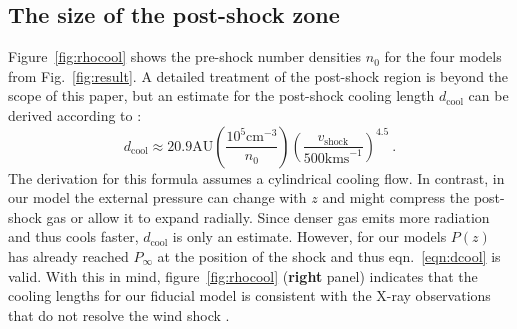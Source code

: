 \subsection{The size of the post-shock zone}
Figure~\ref{fig:rhocool} shows the pre-shock number densities $n_0$ for the four models from Fig.~\ref{fig:result}. A detailed treatment of the post-shock region is beyond the scope of this paper, but an estimate for the post-shock cooling length $d_{\mathrm{cool}}$ can be derived according to \citet{2002ApJ...576L.149R}:
\begin{equation} \label{eqn:dcool}
d_{\mathrm{cool}} \approx 20.9 \mathrm{ AU}
    \left(\frac{10^5\mathrm{ cm}^{-3}}{n_0}\right)
    \left(\frac{v_{\mathrm{shock}}}{500\mathrm{ km s}^{-1}}\right)^{4.5}\ .
\end{equation}
The derivation for this formula assumes a cylindrical cooling flow. In contrast, in our model the external pressure can change with $z$ and might compress the post-shock gas or allow it to expand radially. Since denser gas emits more radiation and thus cools faster, $d_{\mathrm{cool}}$ is only an estimate. However, for our models $P(z)$ has already reached $P_\infty$ at the position of the shock and thus eqn.~\ref{eqn:dcool} is valid. With this in mind, figure~\ref{fig:rhocool} (\textbf{right} panel) indicates that the cooling lengths for our fiducial model is consistent with the X-ray observations that do not resolve the wind shock \citep{2008A&A...488L..13S}.

